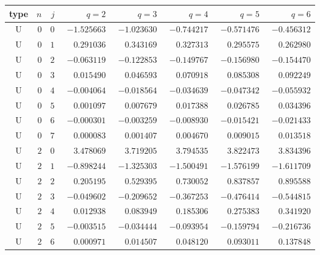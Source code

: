 \begin{table}[H]
\centering\small
\begin{tabular}{crrrrrrr}
\toprule
type & $n$ & $j$ & $q=2$ & $q=3$ & $q=4$ & $q=5$ & $q=6$\\
\midrule
U & $0$ & $0$ & $-1.525663$ & $-1.023630$ & $-0.744217$ & $-0.571476$ & $-0.456312$\\
U & $0$ & $1$ & $\phantom{-}0.291036$ & $\phantom{-}0.343169$ & $\phantom{-}0.327313$ & $\phantom{-}0.295575$ & $\phantom{-}0.262980$\\
U & $0$ & $2$ & $-0.063119$ & $-0.122853$ & $-0.149767$ & $-0.156980$ & $-0.154470$\\
U & $0$ & $3$ & $\phantom{-}0.015490$ & $\phantom{-}0.046593$ & $\phantom{-}0.070918$ & $\phantom{-}0.085308$ & $\phantom{-}0.092249$\\
U & $0$ & $4$ & $-0.004064$ & $-0.018564$ & $-0.034639$ & $-0.047342$ & $-0.055932$\\
U & $0$ & $5$ & $\phantom{-}0.001097$ & $\phantom{-}0.007679$ & $\phantom{-}0.017388$ & $\phantom{-}0.026785$ & $\phantom{-}0.034396$\\
U & $0$ & $6$ & $-0.000301$ & $-0.003259$ & $-0.008930$ & $-0.015421$ & $-0.021433$\\
U & $0$ & $7$ & $\phantom{-}0.000083$ & $\phantom{-}0.001407$ & $\phantom{-}0.004670$ & $\phantom{-}0.009015$ & $\phantom{-}0.013518$\\
\addlinespace[2pt]
U & $2$ & $0$ & $\phantom{-}3.478069$ & $\phantom{-}3.719205$ & $\phantom{-}3.794535$ & $\phantom{-}3.822473$ & $\phantom{-}3.834396$\\
U & $2$ & $1$ & $-0.898244$ & $-1.325303$ & $-1.500491$ & $-1.576199$ & $-1.611709$\\
U & $2$ & $2$ & $\phantom{-}0.205195$ & $\phantom{-}0.529395$ & $\phantom{-}0.730052$ & $\phantom{-}0.837857$ & $\phantom{-}0.895588$\\
U & $2$ & $3$ & $-0.049602$ & $-0.209652$ & $-0.367253$ & $-0.476414$ & $-0.544815$\\
U & $2$ & $4$ & $\phantom{-}0.012938$ & $\phantom{-}0.083949$ & $\phantom{-}0.185306$ & $\phantom{-}0.275383$ & $\phantom{-}0.341920$\\
U & $2$ & $5$ & $-0.003515$ & $-0.034444$ & $-0.093954$ & $-0.159794$ & $-0.216736$\\
U & $2$ & $6$ & $\phantom{-}0.000971$ & $\phantom{-}0.014507$ & $\phantom{-}0.048120$ & $\phantom{-}0.093011$ & $\phantom{-}0.137848$\\

\end{tabular}
\end{table}
